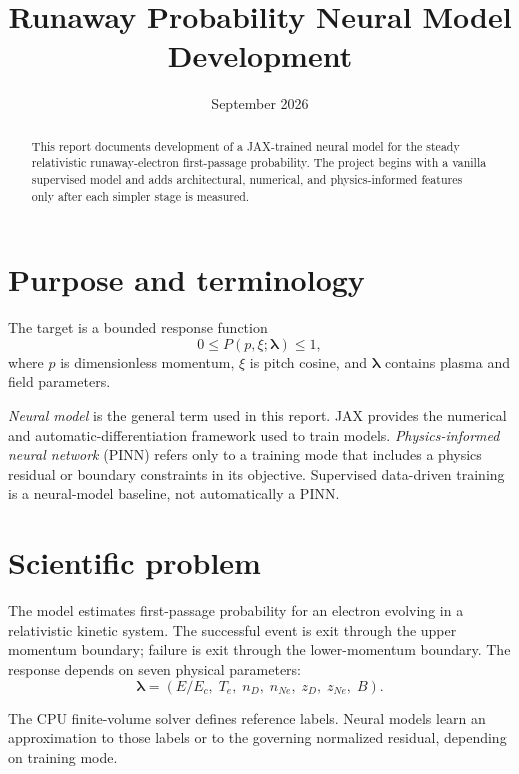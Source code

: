 \documentclass[11pt]{article}
\title{Runaway Probability Neural Model Development}
\author{}
\date{September 2026}
\newcommand{\RPF}{P}
\newcommand{\xiCoord}{\xi}
\newcommand{\param}{\boldsymbol{\lambda}}
\begin{document}
\maketitle

\begin{abstract}
This report documents development of a JAX-trained neural model for the steady
relativistic runaway-electron first-passage probability.  The project begins
with a vanilla supervised model and adds architectural, numerical, and
physics-informed features only after each simpler stage is measured.
\end{abstract}

\tableofcontents
\newpage

\section{Purpose and terminology}

The target is a bounded response function
\begin{equation}
  0 \leq \RPF(p,\xiCoord;\param) \leq 1,
\end{equation}
where $p$ is dimensionless momentum, $\xiCoord$ is pitch cosine, and
$\param$ contains plasma and field parameters.

\emph{Neural model} is the general term used in this report.  JAX provides
the numerical and automatic-differentiation framework used to train models.
\emph{Physics-informed neural network} (PINN) refers only to a training mode
that includes a physics residual or boundary constraints in its objective.
Supervised data-driven training is a neural-model baseline, not automatically
a PINN.

\section{Scientific problem}

The model estimates first-passage probability for an electron evolving in a
relativistic kinetic system.  The successful event is exit through the upper
momentum boundary; failure is exit through the lower-momentum boundary.
The response depends on seven physical parameters:
\begin{equation}
  \param = (E/E_c,\; T_e,\; n_D,\; n_{Ne},\; z_D,\; z_{Ne},\; B).
\end{equation}

The CPU finite-volume solver defines reference labels.  Neural models learn
an approximation to those labels or to the governing normalized residual,
depending on training mode.
\end{document}
